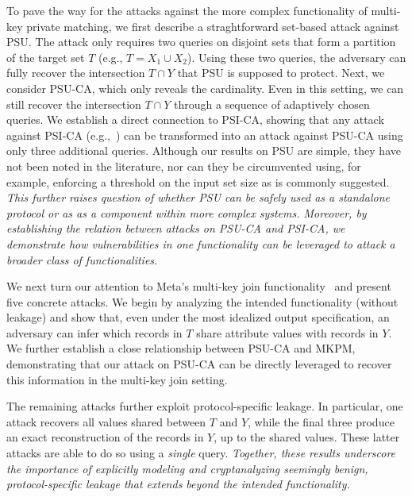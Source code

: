  To pave the way for the attacks
against the more complex functionality of multi-key private matching, we first
describe a straghtforward set-based attack against PSU. The attack only requires two
queries on disjoint sets that form a partition of the target set $T$ (e.g.,
$T = X_1 \cup X_2$). Using these two queries, the adversary can fully recover
the intersection $T \cap Y$ that PSU is supposed to protect. Next, we consider
PSU-CA, which only reveals the cardinality. Even in this setting, we can still
recover the intersection $T \cap Y$ through a sequence of adaptively chosen
queries. We establish a direct connection to PSI-CA, showing that any attack
against PSI-CA (e.g.,~\cite{USENIX:GHLWJL22,NDSS:JiaDuYan24,USENIX:FalTan25})
can be transformed into an attack against PSU-CA using only three additional
queries. Although our results on PSU are simple, they have not been noted in the
literature, nor can they be circumvented using, for example, enforcing a
threshold on the input set size as is commonly suggested. \emph{This further
  raises question of whether PSU can be safely used as a standalone protocol or
  as as a component within more complex systems. Moreover, by establishing the
  relation between attacks on PSU-CA and PSI-CA, we demonstrate how
  vulnerabilities in one functionality can be leveraged to attack a broader
  class of functionalities.}

We next turn our attention to Meta’s multi-key join functionality~\cite{MKPMC} and present five concrete attacks. We begin by analyzing the intended functionality (without leakage) and show that, even under the most idealized output specification, an adversary can infer which records in $T$ share attribute values with records in $Y$.
We further establish a close relationship between PSU-CA and MKPM, demonstrating that our attack on PSU-CA can be directly leveraged to recover this information in the multi-key join setting.

The remaining attacks further exploit protocol-specific leakage. In particular, one attack recovers all values shared between $T$ and $Y$, while the final three produce an exact reconstruction of the records in $Y$, up to the shared values. These latter attacks are able to do so using a \emph{single} query.
\emph{Together, these results underscore the importance of explicitly modeling and cryptanalyzing seemingly benign, protocol-specific leakage that extends beyond the intended functionality.}

